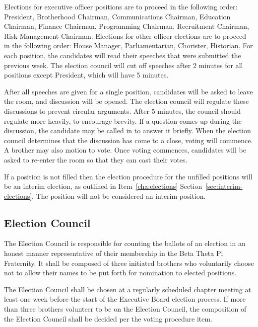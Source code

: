 \label{Election Procedure}
\label{election-procedure}

Elections for executive officer positions are to proceed in the following order:
President, Brotherhood Chairman, Communications Chairman, Education Chairman,
Finance Chairman, Programming Chairman, Recruitment Chairman, Risk Management
Chairman.
Elections for other officer elections are to proceed in the following order:
House Manager, Parliamentarian, Chorister, Historian.
For each position, the candidates will read their speeches that were submitted
the previous week.
The election council will cut off speeches after 2 minutes for all positions
except President, which will have 5 minutes.

After all speeches are given for a single position, candidates will be asked to
leave the room, and discussion will be opened.
The election council will regulate these discussions to prevent circular
arguments.
After 5 minutes, the council should regulate more heavily, to encourage brevity.
If a question comes up during the discussion, the candidate may be called in to
answer it briefly.
When the election council determines that the discussion has come to a close,
voting will commence.
A brother may also motion to vote.
Once voting commences, candidates will be asked to re-enter the room so that
they can cast their votes.

If a position is not filled then the election procedure for the unfilled
positions will be an interim election, as outlined in Item~\ref{cha:elections}
Section~\ref{sec:interim-elections}.
The position will not be considered an interim position.

\subsection{Election Council}
\label{sec:election-council}

The Election Council is responsible for counting the ballots of an election in
an honest manner representative of their membership in the Beta Theta Pi
Fraternity.
It shall be composed of three initiated brothers who voluntarily choose not to
allow their names to be put forth for nomination to elected positions.

The Election Council shall be chosen at a regularly scheduled chapter meeting at
least one week before the start of the Executive Board election process.
If more than three brothers volunteer to be on the Election Council, the
composition of the Election Council shall be decided per the voting procedure
item.

